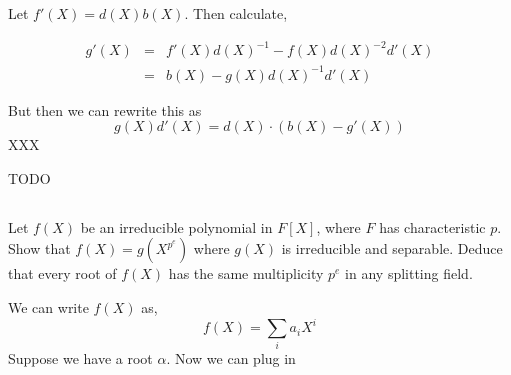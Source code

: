 \documentclass{article}
\begin{document}
Let \(f'(X) = d(X)b(X)\). Then calculate,

\begin{subequations}
\begin{align}
g'(X) & = & f'(X)d(X)^{-1} - f(X)d(X)^{-2}d'(X) \\
& = & b(X) - g(X)d(X)^{-1}d'(X)
\end{align}
\end{subequations}

But then we can rewrite this as
\begin{equation}
g(X)d'(X) = d(X)\cdot(b(X) - g'(X))
\end{equation}
XXX

TODO

\subsection{}
Let \(f(X)\) be an irreducible polynomial in \(F\left[X\right]\), where \(F\) has characteristic \(p\). Show that \(f(X) = g(X^{p^{e}})\) where \(g(X)\) is irreducible and separable. Deduce that every root of \(f(X)\) has the same multiplicity \(p^{e}\) in any splitting field.

We can write \(f(X)\) as,
\begin{equation}
f(X) = \sum_{i}a_{i}X^{i}
\end{equation}
Suppose we have a root \(\alpha\). Now we can plug in
\end{document}
